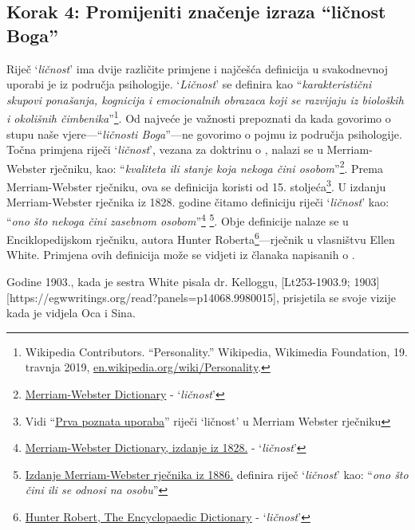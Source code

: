 \subsection*{Korak 4: Promijeniti značenje izraza “ličnost Boga”}

Riječ ‘\textit{ličnost}’ ima dvije različite primjene i najčešća definicija u svakodnevnoj uporabi je iz područja psihologije. ‘\textit{Ličnost}’ se definira kao “\textit{karakteristični skupovi ponašanja, kognicija i emocionalnih obrazaca koji se razvijaju iz bioloških i okolišnih čimbenika}”\footnote{Wikipedia Contributors. “Personality.” Wikipedia, Wikimedia Foundation, 19. travnja 2019, \href{https://en.wikipedia.org/wiki/Personality}{en.wikipedia.org/wiki/Personality}.}. Od najveće je važnosti prepoznati da kada govorimo o stupu naše vjere—“\textit{ličnosti Boga}”—ne govorimo o pojmu iz područja psihologije. Točna primjena riječi ‘\textit{ličnost}’, vezana za doktrinu o , nalazi se u Merriam-Webster rječniku, kao: “\textit{kvaliteta ili stanje koja nekoga čini osobom}”\footnote{\href{https://www.merriam-webster.com/dictionary/personality}{Merriam-Webster Dictionary} - ‘\textit{ličnost}’}. Prema Merriam-Webster rječniku, ova se definicija koristi od 15. stoljeća\footnote{Vidi “\href{https://www.merriam-webster.com/dictionary/personality\#word-history}{Prva poznata uporaba}” riječi ‘ličnost’ u Merriam Webster rječniku}. U izdanju Merriam-Webster rječnika iz 1828. godine čitamo definiciju riječi ‘\textit{ličnost}’ kao: “\textit{ono što nekoga čini zasebnom osobom}”\footnote{\href{https://archive.org/details/americandictiona02websrich/page/272/mode/2up}{Merriam-Webster Dictionary, izdanje iz 1828.} - ‘\textit{ličnost}’} \footnote{\href{https://archive.org/details/websterscomplete00webs/page/974/mode/2up}{Izdanje Merriam-Webster rječnika iz 1886.} definira riječ ‘\textit{ličnost}’ kao: “\textit{ono što čini ili se odnosi na osobu}”}. Obje definicije nalaze se u Enciklopedijskom rječniku, autora Hunter Roberta\footnote{\href{https://babel.hathitrust.org/cgi/pt?id=mdp.39015050663213&view=1up&seq=780}{Hunter Robert, The Encyclopaedic Dictionary} - ‘\textit{ličnost}’}—rječnik u vlasništvu Ellen White. Primjena ovih definicija može se vidjeti iz članaka napisanih o .

Godine 1903., kada je sestra White pisala dr. Kelloggu, [Lt253-1903.9; 1903][https://egwwritings.org/read?panels=p14068.9980015], prisjetila se svoje vizije kada je vidjela Oca i Sina.

